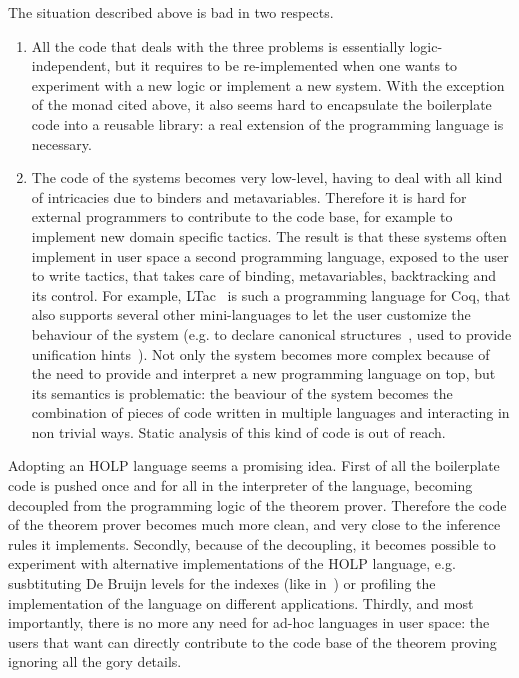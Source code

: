 \documentclass[preprint]{sigplanconf}
\begin{document}
The situation described above is bad in two respects.
\begin{enumerate}
\item All the code that deals with the three problems is essentially logic-independent, but it requires to be re-implemented when one wants to experiment with a new logic or implement a new system. With the exception of the monad cited above, it also seems hard to encapsulate the boilerplate code into a reusable library: a real extension of the programming language is necessary.
\item The code of the systems becomes very low-level, having to deal with all kind of intricacies due to binders and metavariables. Therefore it is hard for external programmers to contribute to the code base, for example to implement new domain specific tactics. The result is that these systems often implement in user space a second programming language, exposed to the user to write tactics, that takes care of binding, metavariables, backtracking and its control. For example, LTac~\cite{delahaye2000} is such a programming language for Coq, that also supports several other mini-languages to let the user customize the behaviour of the system (e.g. to declare canonical structures~\cite{canstruct}, used to provide unification hints~\cite{asperti1}). Not only the system becomes more complex because of the need to provide and interpret a new programming language on top, but its semantics is problematic: the beaviour of the system becomes the combination of pieces of code written in multiple languages and interacting in non trivial ways. Static analysis of this kind of code is out of reach.
\end{enumerate}

Adopting an HOLP language seems a promising idea. First of all the boilerplate code is pushed once and for all in the interpreter of the language, becoming decoupled from the programming logic of the theorem prover. Therefore the code of the theorem prover becomes much more clean, and very close to the inference rules it implements. Secondly, because of the decoupling, it becomes possible to experiment with alternative implementations of the HOLP language, e.g. susbtituting De Bruijn levels for the indexes (like in~\cite{debrujn1}) or profiling the implementation of the language on different applications. Thirdly, and most importantly, there is no more any need for ad-hoc languages in user space: the users that want can directly contribute to the code base of the theorem proving ignoring all the gory details.
\end{document}
